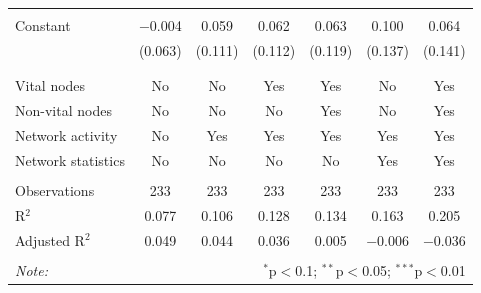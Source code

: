 \begin{table}[!htbp]
\begin{tabular}{@{\extracolsep{5pt}}lcccccc}
  & & & & & & \\ 
 Constant & $-$0.004 & 0.059 & 0.062 & 0.063 & 0.100 & 0.064 \\ 
  & (0.063) & (0.111) & (0.112) & (0.119) & (0.137) & (0.141) \\ 
  & & & & & & \\ 
\hline \\[-1.8ex] 
Vital nodes & No & No & Yes & Yes & No & Yes \\ 
Non-vital nodes & No & No & No & Yes & No & Yes \\ 
Network activity & No & Yes & Yes & Yes & Yes & Yes \\ 
Network statistics & No & No & No & No & Yes & Yes \\ 
\hline &  &  &  &  &  &  \\ 
Observations & 233 & 233 & 233 & 233 & 233 & 233 \\ 
R$^{2}$ & 0.077 & 0.106 & 0.128 & 0.134 & 0.163 & 0.205 \\ 
Adjusted R$^{2}$ & 0.049 & 0.044 & 0.036 & 0.005 & $-$0.006 & $-$0.036 \\ 
\hline 
\hline \\[-1.8ex] 
\textit{Note:}  & \multicolumn{6}{r}{$^{*}$p$<$0.1; $^{**}$p$<$0.05; $^{***}$p$<$0.01} \\ 
\end{tabular} 
\end{table} 

